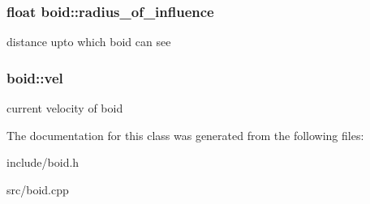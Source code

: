 \subsubsection[{\texorpdfstring{radius\+\_\+of\+\_\+influence}{radius_of_influence}}]{\setlength{\rightskip}{0pt plus 5cm}float boid\+::radius\+\_\+of\+\_\+influence}\hypertarget{classboid_a1be0d96d6dd39b6ebd29346c0da8a8ab}{}\label{classboid_a1be0d96d6dd39b6ebd29346c0da8a8ab}
distance upto which boid can see 
\subsubsection[{\texorpdfstring{vel}{vel}}]{ boid\+::vel}\hypertarget{classboid_afc5791cc3a3915aff98b9e7ca88d9570}{}\label{classboid_afc5791cc3a3915aff98b9e7ca88d9570}
current velocity of boid 

The documentation for this class was generated from the following files\+:\begin{DoxyCompactItemize}
\item 
include/boid.\+h\item 
src/boid.\+cpp\end{DoxyCompactItemize}
